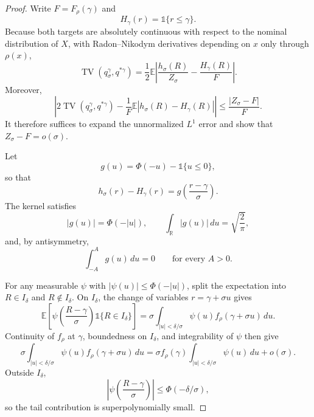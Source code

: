 \vspace{0.3cm}
\begin{proof}
Write $F=F_\rho(\gamma)$ and
\[
    H_\gamma(r)
    =
    \mathds{1}\{r\leq\gamma\}.
\]
Because both targets are absolutely continuous with respect to the nominal distribution of $X$, with Radon--Nikodym derivatives depending on $x$ only through $\rho(x)$,
\[
    \operatorname{TV}
    \left(
        q_\sigma^\gamma,
        q^{*\gamma}
    \right)
    =
    \frac{1}{2}
    \mathbb E
    \left|
        \frac{h_\sigma(R)}{Z_\sigma}
        -
        \frac{H_\gamma(R)}{F}
    \right|.
\]
Moreover,
\begin{equation}
\label{eq:tv-normalization-split}
    \left|
        2\operatorname{TV}
        \left(
            q_\sigma^\gamma,
            q^{*\gamma}
        \right)
        -
        \frac{1}{F}
        \mathbb E
        \left|
            h_\sigma(R)-H_\gamma(R)
        \right|
    \right|
    \leq
    \frac{|Z_\sigma-F|}{F}.
\end{equation}
It therefore suffices to expand the unnormalized $L^1$ error and show that $Z_\sigma-F=o(\sigma)$.

Let
\[
    g(u)
    =
    \Phi(-u)
    -
    \mathds{1}\{u\leq0\},
\]
so that
\[
    h_\sigma(r)-H_\gamma(r)
    =
    g\!\left(
        \frac{r-\gamma}{\sigma}
    \right).
\]
The kernel satisfies
\[
    |g(u)|
    =
    \Phi(-|u|),
    \qquad
    \int_{\mathbb R}|g(u)|\,du
    =
    \sqrt{\frac{2}{\pi}},
\]
and, by antisymmetry,
\[
    \int_{-A}^{A}g(u)\,du
    =
    0
    \qquad
    \text{for every }A>0.
\]

For any measurable $\psi$ with $|\psi(u)|\leq\Phi(-|u|)$, split the expectation into $R\in I_\delta$ and $R\notin I_\delta$. On $I_\delta$, the change of variables $r=\gamma+\sigma u$ gives
\[
    \mathbb E
    \left[
        \psi\!\left(
            \frac{R-\gamma}{\sigma}
        \right)
        \mathds{1}\{R\in I_\delta\}
    \right]
    =
    \sigma
    \int_{|u|<\delta/\sigma}
    \psi(u)
    f_\rho(\gamma+\sigma u)\,du.
\]
Continuity of $f_\rho$ at $\gamma$, boundedness on $I_\delta$, and integrability of $\psi$ then give
\[
    \sigma
    \int_{|u|<\delta/\sigma}
    \psi(u)f_\rho(\gamma+\sigma u)\,du
    =
    \sigma f_\rho(\gamma)
    \int_{|u|<\delta/\sigma}\psi(u)\,du
    +
    o(\sigma).
\]
Outside $I_\delta$,
\[
    \left|
        \psi\!\left(
            \frac{R-\gamma}{\sigma}
        \right)
    \right|
    \leq
    \Phi(-\delta/\sigma),
\]
so the tail contribution is superpolynomially small.


\end{proof}
